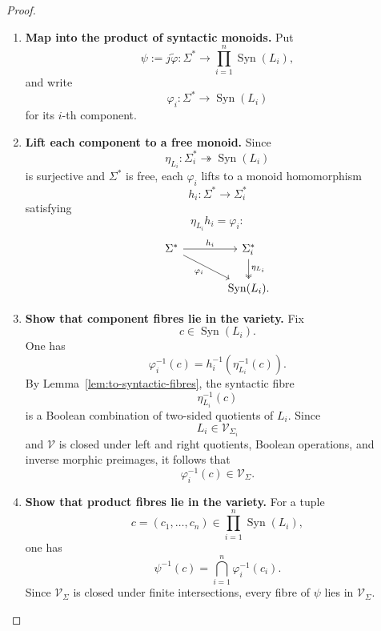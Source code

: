 \begin{proof}
\begin{enumerate}
        \item \textbf{Map into the product of syntactic monoids.}
        Put
        \[
            \psi:=j\widetilde\varphi:
            \Sigma^*\to
            \prod_{i=1}^n\operatorname{Syn}(L_i),
        \]
        and write
        \[
            \varphi_i:
            \Sigma^*\to\operatorname{Syn}(L_i)
        \]
        for its \(i\)-th component.

        \item \textbf{Lift each component to a free monoid.}
        Since
        \[
            \eta_{L_i}:
            \Sigma_i^*\twoheadrightarrow
            \operatorname{Syn}(L_i)
        \]
        is surjective and \(\Sigma^*\) is free, each \(\varphi_i\) lifts to a
        monoid homomorphism
        \[
            h_i:\Sigma^*\to\Sigma_i^*
        \]
        satisfying
        \[
            \eta_{L_i}h_i=\varphi_i:
        \]
        \[
        \begin{tikzcd}[column sep=large]
            \Sigma^*
                \arrow[r, "h_i"]
                \arrow[dr, "\varphi_i"']
            &
            \Sigma_i^*
                \arrow[d, two heads, "\eta_{L_i}"]
            \\
            &
            \operatorname{Syn}(L_i).
        \end{tikzcd}
        \]

        \item \textbf{Show that component fibres lie in the variety.}
        Fix
        \[
            c\in\operatorname{Syn}(L_i).
        \]
        One has
        \[
            \varphi_i^{-1}(c)
            =
            h_i^{-1}
            \left(
                \eta_{L_i}^{-1}(c)
            \right).
        \]
        By Lemma~\ref{lem:to-syntactic-fibres}, the syntactic fibre
        \[
            \eta_{L_i}^{-1}(c)
        \]
        is a Boolean combination of two-sided quotients of \(L_i\).
        Since
        \[
            L_i\in\mathcal V_{\Sigma_i}
        \]
        and \(\mathcal V\) is closed under left and right quotients, Boolean
        operations, and inverse morphic preimages, it follows that
        \[
            \varphi_i^{-1}(c)
            \in
            \mathcal V_\Sigma.
        \]

        \item \textbf{Show that product fibres lie in the variety.}
        For a tuple
        \[
            c=(c_1,\dots,c_n)
            \in
            \prod_{i=1}^n\operatorname{Syn}(L_i),
        \]
        one has
        \[
            \psi^{-1}(c)
            =
            \bigcap_{i=1}^n
            \varphi_i^{-1}(c_i).
        \]
        Since \(\mathcal V_\Sigma\) is closed under finite intersections,
        every fibre of \(\psi\) lies in \(\mathcal V_\Sigma\).


\end{enumerate}
\end{proof}

